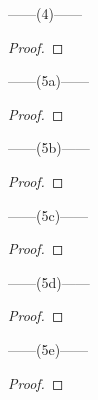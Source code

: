 \documentclass[12pt]{article}
\begin{document}
\newpage
\noindent
\begin{center}
    ------(4)------
\end{center} 
\begin{proof}
    
\end{proof}


\newpage
\noindent
\begin{center}
    ------(5a)------
\end{center} 
\begin{proof}
    
\end{proof}

\noindent
\begin{center}
    ------(5b)------
\end{center} 
\begin{proof}
    
\end{proof}

\noindent
\begin{center}
    ------(5c)------
\end{center} 
\begin{proof}
    
\end{proof}

\noindent
\begin{center}
    ------(5d)------
\end{center} 
\begin{proof}
    
\end{proof}

\noindent
\begin{center}
    ------(5e)------
\end{center} 
\begin{proof}
    
\end{proof}
\end{document}
